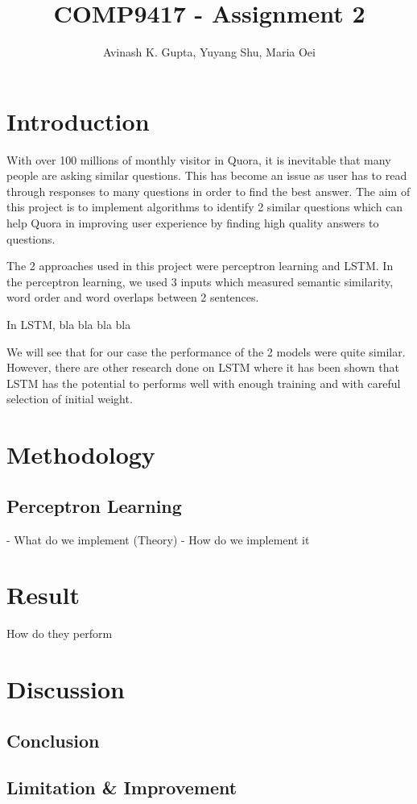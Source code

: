 \documentclass[11pt, oneside]{article}   	%
\title{COMP9417 - Assignment 2}
\author{Avinash K. Gupta, Yuyang Shu, Maria Oei}
\begin{document}
\maketitle


\section{Introduction}

With over 100 millions of monthly visitor in Quora, it is inevitable that many people are asking similar questions. This has become an issue as user has to read through responses to many questions in order to find the best answer. The aim of this project is to implement algorithms to identify 2 similar questions which can help Quora in improving user experience by finding high quality answers to questions.

The 2 approaches used in this project were perceptron learning and LSTM. In the perceptron learning, we used 3 inputs which measured semantic similarity, word order and word overlaps between 2 sentences.

In LSTM, bla bla bla bla

We will see that for our case the performance of the 2 models were quite similar. However, there are other research done on LSTM where it has been shown that LSTM has the potential to performs well with enough training and with careful selection of initial weight.

\section{Methodology}

\subsection{Perceptron Learning}
- What do we implement (Theory)
- How do we implement it




\section{Result}
How do they perform

\section{Discussion}
\subsection{Conclusion}
 \subsection{Limitation \& Improvement}
\end{document}
